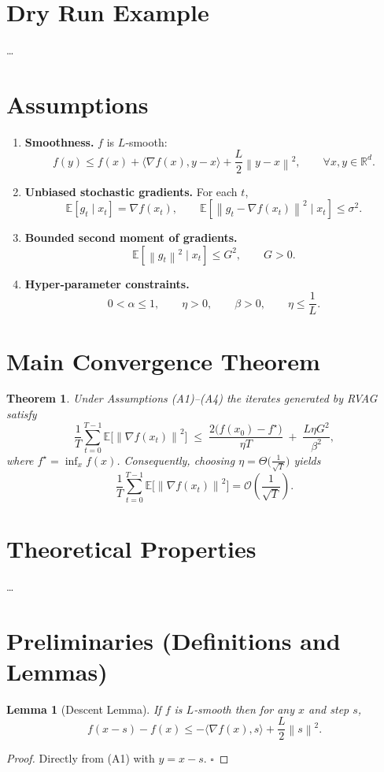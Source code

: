 \documentclass{article}
\newtheorem{theorem}{Theorem}
\newtheorem{lemma}{Lemma}
\newcommand{\EE}{\mathbb{E}}
\newcommand{\norm}[1]{\left\lVert#1\right\rVert}
\begin{document}
\section*{Dry Run Example}
\ldots  %

\section*{Assumptions}
\begin{enumerate}
    \item \textbf{Smoothness.} $f$ is $L$‑smooth:
    \[
    f(y)\le f(x)+\langle\nabla f(x),y-x\rangle+\frac{L}{2}\norm{y-x}^2,\qquad\forall x,y\in\mathbb{R}^d.
    \tag{A1}
    \]
    \item \textbf{Unbiased stochastic gradients.} For each $t$,
    \[
    \EE[g_t\mid x_t]=\nabla f(x_t),\qquad
    \EE\!\left[\norm{g_t-\nabla f(x_t)}^2\mid x_t\right]\le\sigma^2.
    \tag{A2}
    \]
    \item \textbf{Bounded second moment of gradients.}
    \[
    \EE\!\left[\norm{g_t}^2\mid x_t\right]\le G^2,\qquad G>0.
    \tag{A3}
    \]
    \item \textbf{Hyper‑parameter constraints.}
    \[
    0<\alpha\le 1,\qquad \eta>0,\qquad \beta>0,\qquad \eta\le \frac{1}{L}.
    \tag{A4}
    \]
\end{enumerate}

\section*{Main Convergence Theorem}
\begin{theorem}\label{thm:main}
Under Assumptions (A1)–(A4) the iterates generated by RVAG satisfy
\[
\frac{1}{T}\sum_{t=0}^{T-1}\EE\!\bigl[\norm{\nabla f(x_t)}^2\bigr]
\;\le\;
\frac{2\bigl(f(x_0)-f^\star\bigr)}{\eta T}
\;+\;
\frac{L\eta G^2}{\beta^{2}},
\]
where $f^\star=\inf_{x}f(x)$. Consequently, choosing $\eta =\Theta\!\bigl(\tfrac{1}{\sqrt{T}}\bigr)$ yields
\[
\frac{1}{T}\sum_{t=0}^{T-1}\EE\!\bigl[\norm{\nabla f(x_t)}^2\bigr]=\mathcal{O}\!\left(\frac{1}{\sqrt{T}}\right).
\]
\end{theorem}

\section*{Theoretical Properties}
\ldots  %

\section*{Preliminaries (Definitions and Lemmas)}
\begin{lemma}[Descent Lemma]\label{lem:descent}
If $f$ is $L$‑smooth then for any $x$ and step $s$,
\[
f(x-s)-f(x)\le -\langle\nabla f(x),s\rangle+\frac{L}{2}\norm{s}^2 .
\]
\end{lemma}
\begin{proof}
Directly from (A1) with $y=x-s$. \hfill $\square$
\end{proof}
\end{document}
